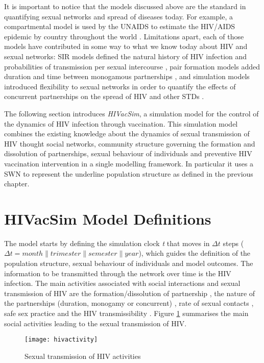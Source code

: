 It is important to notice that the models discussed above are the standard in quantifying
sexual networks and spread of diseases today. For example, a compartmental model is used
by the UNAIDS to estimate the HIV/AIDS epidemic by country throughout the world
\cite{UNAIDSRG2002}. Limitations apart, each of those models have contributed in some way
to what we know today about HIV and sexual networks: SIR models defined the natural
history of HIV infection and probabilities of transmission per sexual intercourse
\cite{Anderson1988,Gupta1989,Gray2003}, pair formation models added duration and time
between monogamous partnerships \cite{Dietz1988,Dietz1988a}, and simulation models
introduced flexibility to sexual networks in order to quantify the effects of concurrent
partnerships on the spread of HIV and other STDs
\cite{Kretschmar1996,morrism1997,morris1997,Kretzschmar2000}.

The following section introduces \textit{HIVacSim}, a simulation model for the control of
the dynamics of HIV infection through vaccination. This simulation model combines the
existing knowledge about the dynamics of sexual transmission of HIV thought social
networks, community structure governing the formation and dissolution of partnerships,
sexual behaviour of individuals and preventive HIV vaccination intervention in a single
modelling framework. In particular it uses a SWN to represent the underline population
structure as defined in the previous chapter.

\section{HIVacSim Model Definitions}\label{hivacsim}

The model starts by defining the simulation clock \emph{t} that moves in $\Delta t$ steps
($\Delta t = month \| trimester \| semester \| year$), which guides the definition of the
population structure, sexual behaviour of individuals and model outcomes. The information
to be transmitted through the network over time is the HIV infection. The main activities
associated with social interactions and sexual transmission of HIV are the
formation/dissolution of partnership \cite{Kretzschmar2000}, the nature of the
partnerships (duration, monogamy or concurrent) \cite{morris1997}, rate of sexual
contacts \cite{Anderson1988, UNAIDSRG2002}, safe sex practice \cite{Ahmed2001,Gremy2004}
and the HIV transmissibility \cite{Fauci1996, Donovan2000}. Figure \ref{hivactivity}
summarises the main social activities leading to the sexual transmission of HIV.
\begin{figure}[h]
\begin{center}
\texttt{[image: hivactivity]}
\caption{Sexual transmission of HIV activities} \label{hivactivity}
\end{center}
\end{figure}

